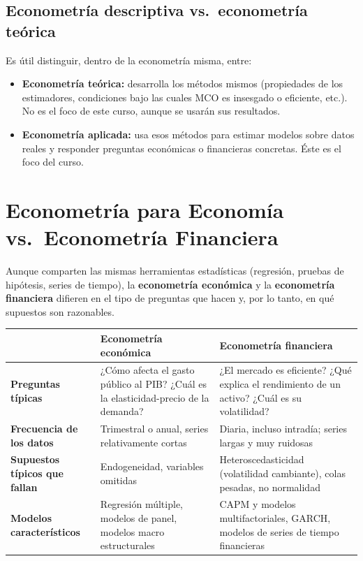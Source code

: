 \documentclass[11pt,a4paper,oneside]{article}
\theoremstyle{definition}
\begin{document}
\subsection{Econometría descriptiva vs.\ econometría teórica}
Es útil distinguir, dentro de la econometría misma, entre:
\begin{itemize}[nosep]
\item \textbf{Econometría teórica:} desarrolla los métodos mismos (propiedades
de los estimadores, condiciones bajo las cuales MCO es insesgado o eficiente,
etc.). No es el foco de este curso, aunque se usarán sus resultados.
\item \textbf{Econometría aplicada:} usa esos métodos para estimar modelos
sobre datos reales y responder preguntas económicas o financieras concretas.
Éste es el foco del curso.
\end{itemize}

\section{Econometría para Economía vs.\ Econometría Financiera}

Aunque comparten las mismas herramientas estadísticas (regresión, pruebas de
hipótesis, series de tiempo), la \textbf{econometría económica} y la
\textbf{econometría financiera} difieren en el tipo de preguntas que hacen y,
por lo tanto, en qué supuestos son razonables.

\begin{center}
\renewcommand{\arraystretch}{1.35}
\begin{tabular}{p{4.1cm}p{5.2cm}p{5.2cm}}
\toprule
& \textbf{Econometría económica} & \textbf{Econometría financiera} \\
\midrule
\textbf{Preguntas típicas} & ¿Cómo afecta el gasto público al PIB? ¿Cuál es la elasticidad-precio de la demanda? & ¿El mercado es eficiente? ¿Qué explica el rendimiento de un activo? ¿Cuál es su volatilidad? \\
\textbf{Frecuencia de los datos} & Trimestral o anual, series relativamente cortas & Diaria, incluso intradía; series largas y muy ruidosas \\
\textbf{Supuestos típicos que fallan} & Endogeneidad, variables omitidas & Heteroscedasticidad (volatilidad cambiante), colas pesadas, no normalidad \\
\textbf{Modelos característicos} & Regresión múltiple, modelos de panel, modelos macro estructurales & CAPM y modelos multifactoriales, GARCH, modelos de series de tiempo financieras \\
\bottomrule
\end{tabular}
\end{center}
\end{document}
